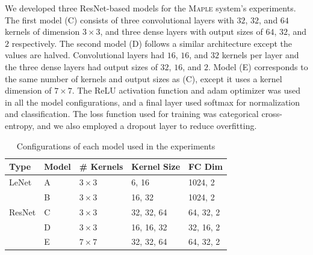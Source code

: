 We developed three ResNet-based models for the \textsc{Maple} system's experiments. The first model (C) consists of three convolutional layers with $32$, $32$, and $64$ kernels of dimension $3\times3$, and three dense layers with output sizes of $64$, $32$, and $2$ respectively. The second model (D) follows a similar architecture except the values are halved. Convolutional layers had $16$, $16$, and $32$ kernels per layer and the three dense layers had output sizes of $32$, $16$, and $2$. Model (E) corresponds to the same number of kernels and output sizes as (C), except it uses a kernel dimension of $7\times7$. The ReLU activation function and adam optimizer was used in all the model configurations, and a final layer used softmax for normalization and classification. The loss function used for training was categorical cross-entropy, and we also employed a dropout layer to reduce overfitting.

\begin{table} [h!]
\centering
\begin{tabular}{| l | l | l | l | l |}
\hline
Type & Model & \# Kernels & Kernel Size & FC Dim \\
\hline
LeNet & A & $3\times3$ & 6, 16 & 1024, 2 \\
\cline{2-5}
& B & $3\times3$ & 16, 32 & 1024, 2 \\
\hline
ResNet & C & $3\times3$ & 32, 32, 64 & 64, 32, 2 \\
\cline{2-5}
& D & $3\times3$ & 16, 16, 32 & 32, 16, 2 \\
\cline{2-5}
& E & $7\times7$ & 32, 32, 64 & 64, 32, 2 \\
\cline{2-5}
\hline
\end{tabular}
\caption{Configurations of each model used in the experiments}
\label{table:attacks}
\end{table}
